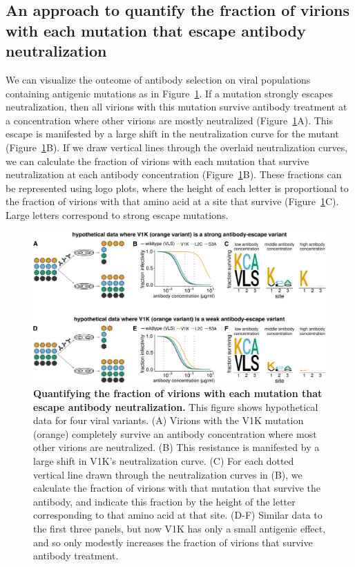 \documentclass[11pt]{article}
\begin{document}
\subsection*{An approach to quantify the fraction of virions with each mutation that escape antibody neutralization}
We can visualize the outcome of antibody selection on viral populations containing antigenic mutations as in Figure~\ref{fig:fracsurvive_example}.
If a mutation strongly escapes neutralization, then all virions with this mutation survive antibody treatment at a concentration where other virions are mostly neutralized (Figure~\ref{fig:fracsurvive_example}A).
This escape is manifested by a large shift in the neutralization curve for the mutant (Figure~\ref{fig:fracsurvive_example}B).
If we draw vertical lines through the overlaid neutralization curves, we can calculate the fraction of virions with each mutation that survive neutralization at each antibody concentration (Figure~\ref{fig:fracsurvive_example}B).
These fractions can be represented using logo plots, where the height of each letter is proportional to the fraction of virions with that amino acid at a site that survive (Figure~\ref{fig:fracsurvive_example}C).
Large letters correspond to strong escape mutations. 

\begin{figure}
\centerline{\includegraphics[width=\textwidth]{figs/fracsurvive_example/fracsurvive_fig.pdf}}
\caption{\label{fig:fracsurvive_example}
{\bf Quantifying the fraction of virions with each mutation that escape antibody neutralization.}
This figure shows hypothetical data for four viral variants.
(A) Virions with the V1K mutation (orange) completely survive an antibody concentration where most other virions are neutralized.
(B) This resistance is manifested by a large shift in V1K's neutralization curve.
(C) For each dotted vertical line drawn through the neutralization curves in (B), we calculate the fraction of virions with that mutation that survive the antibody, and indicate this fraction by the height of the letter corresponding to that amino acid at that site.
(D-F) Similar data to the first three panels, but now V1K has only a small antigenic effect, and so only modestly increases the fraction of virions that survive antibody treatment.
}
\end{figure}
\end{document}
